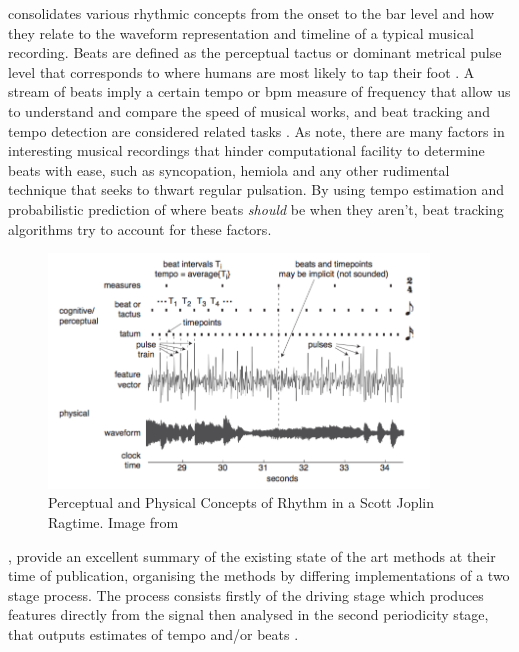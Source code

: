 { consolidates various rhythmic concepts from the onset to the bar level and how they relate to the waveform representation and timeline of a typical musical recording. Beats are defined as the perceptual tactus or dominant metrical pulse level that corresponds to where humans are most likely to tap their foot \citep{Jehan2005, Ellis2007a, Stark2009}. A stream of beats imply a certain tempo or \acrlong{bpm} measure of frequency that allow us to understand and compare the speed of musical works, and beat tracking and tempo detection are considered related tasks \citep{McKinney2007}. As \cite{Korzeniowski2014} note, there are many factors in interesting musical recordings that hinder computational facility to determine beats with ease, such as syncopation, hemiola and any other rudimental technique that seeks to thwart regular pulsation. By using tempo estimation and probabilistic prediction of where beats \textit{should} be when they aren't, beat tracking algorithms try to account for these factors. 

\begin{figure}
	\begin{center}
		\includegraphics[width=0.9\textwidth]{ch05_pyconcat/figures/joplin.png}
	\end{center}
	\caption[Perceptual and Physical Concepts of Rhythm in a Scott Joplin Ragtime]{Perceptual and Physical Concepts of Rhythm in a Scott Joplin Ragtime. Image from \cite{Sethares2007}}
	\label{fig:beat_joplin}
\end{figure}

\cite{McKinney2007}, provide an excellent summary of the existing state of the art methods at their time of publication, organising the methods by differing implementations of a two stage process. The process consists firstly of the driving stage which produces features directly from the signal then analysed in the second periodicity stage, that outputs estimates of tempo and/or beats \citep{McKinney2007}.

}
